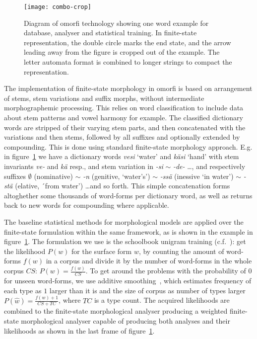 \documentclass[a4paper,12pt]{article}
\begin{document}
\begin{figure}[tb!]
    \texttt{[image: combo-crop]}
    \caption{Diagram of omorfi technology showing one word example for
        database, analyser and statistical training. In finite-state
        representation, the double circle marks the end state, and the arrow
        leading away from the figure is cropped out of the example. The
        letter automata format is combined to longer strings to compact
        the representation.
    \label{fig:combo}}
\end{figure}

The implementation of finite-state morphology in omorfi is based on
arrangement of stems, stem variations and suffix morphs, without
intermediate morphographemic processing. This relies on word classification
to include data about stem patterns and vowel harmony for example. The
classified dictionary words are stripped of their varying stem parts, and
then concatenated with the variations and then stems, followed by all
suffixes and optionally extended by compounding. This is done using standard
finite-state morphology approach. E.g.  in figure~\ref{fig:combo} we have a
dictionary words \textit{vesi} `water' and \textit{käsi} `hand' with stem
invariants \textit{ve-} and \textit{kä} resp., and stem variation in
\textit{-si} $\sim$ \textit{-de-} \ldots, and respectively suffixes
$\emptyset$ (nominative) $\sim$ \textit{-n} (genitive, `water's') $\sim$
\textit{-ssä} (inessive `in water')  $\sim$ \textit{-stä} (elative, ´from
water') \ldots and so forth. This simple concatenation forms altoghether
some thousands of word-forms per dictionary word, as well as returns back to
new words for compounding where applicable.

The baseline statistical methods for morphological models are applied over
the finite-state formulation within the same framework, as is shown in the
example in figure~\ref{fig:combo}.  The formulation we use is the schoolbook
unigram training (c.f.~\cite{manning1999foundations}): get the likelihood $P(w)$ for the
surface form $w$, by counting the amount of word-forms $f(w)$ in a corpus
and divide it by the number of word-forms in the whole corpus $CS$: $P(w) =
\frac{f(w)}{CS}$.  To get around the problems with the probability of $0$
for unseen word-forms, we use additive smoothing~\citep{chen1999empirical},
which estimates frequency of each type as $1$ larger than it is and the size
of corpus as number of types larger $P(\hat w) = \frac{f(w) + 1}{CS + TC}$,
where $TC$ is a type count. The acquired likelihoods are combined to the
finite-state morphological analyser producing a weighted finite-state
morphological analyser capable of producing both analyses and their
likelihoods as shown in the last frame of figure~\ref{fig:combo}.
\end{document}
